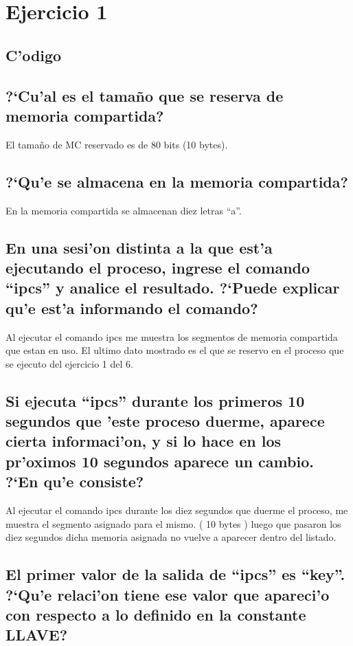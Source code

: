 \documentclass[a4paper,11pt]{article}
\newcommand{\?}{?`}
\begin{document}

\setcounter{page}{1}
\tableofcontents
\newpage
\setcounter{page}{1}

\section{Ejercicio 1}

\subsection{C'odigo}


\subsection[Punto A]{\?Cu'al es el tama\~no que se reserva de memoria compartida?}
El tama\~no de MC reservado es de 80 bits (10 bytes).

\subsection[Punto B]{\?Qu'e se almacena en la memoria compartida?}
En la memoria compartida se almacenan diez letras ``a''.

\subsection[Punto C]{En una sesi'on distinta a la que est'a ejecutando el proceso, ingrese el comando ``ipcs'' y analice el resultado. \?Puede explicar qu'e est'a informando el comando?}
Al ejecutar el comando ipcs me muestra los segmentos de memoria compartida que estan en uso. El ultimo dato mostrado es el que se reservo en el proceso que se ejecuto del ejercicio 1 del 6.

\subsection[Punto D]{Si ejecuta ``ipcs'' durante los primeros 10 segundos que 'este proceso duerme, aparece cierta informaci'on, y si lo hace en los pr'oximos 10 segundos aparece un cambio. \?En qu'e consiste?}

Al ejecutar el comando ipcs durante los diez segundos que duerme el proceso, me muestra el segmento asignado para el mismo. ( 10 bytes ) luego que pasaron los diez segundos dicha memoria asignada no vuelve a aparecer dentro del listado.

\subsection[Punto E]{El primer valor de la salida de ``ipcs'' es ``key''. \?Qu'e relaci'on tiene ese valor que apareci'o con respecto a lo definido en la constante LLAVE?}
\end{document}
